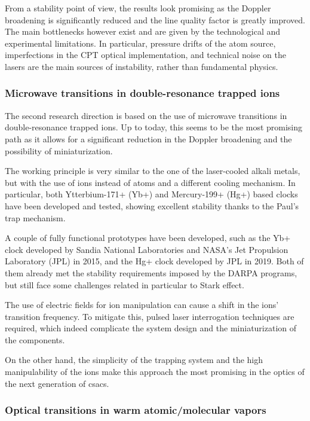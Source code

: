 From a stability point of view, the results look promising as the Doppler broadening is significantly reduced and the line quality factor is greatly improved.
The main bottlenecks however exist and are given by the technological and experimental limitations.
In particular, pressure drifts of the atom source, imperfections in the CPT optical implementation, and technical noise on the lasers are the main sources of instability, rather than fundamental physics.


\subsubsection{Microwave transitions in double-resonance trapped ions}
\label{subsubsec:double_resonance_ions}

The second research direction is based on the use of microwave transitions in double-resonance trapped ions.
Up to today, this seems to be the most promising path as it allows for a significant reduction in the Doppler broadening and the possibility of miniaturization.

The working principle is very similar to the one of the laser-cooled alkali metals, but with the use of ions instead of atoms and a different cooling mechanism.
In particular, both Ytterbium-171+ (Yb+) and Mercury-199+ (Hg+) based clocks have been developed and tested, showing excellent stability thanks to the Paul's trap mechanism.

A couple of fully functional prototypes have been developed, such as the Yb+ clock developed by Sandia National Laboratories and NASA's Jet Propulsion Laboratory (JPL) in 2015, and the Hg+ clock developed by JPL in 2019.
Both of them already met the stability requirements imposed by the DARPA programs, but still face some challenges related in particular to Stark effect.

The use of electric fields for ion manipulation can cause a shift in the ions' transition frequency.
To mitigate this, pulsed laser interrogation techniques are required, which indeed complicate the system design and the miniaturization of the components.

On the other hand, the simplicity of the trapping system and the high manipulability of the ions make this approach the most promising in the optics of the next generation of \acrshort{csacs}.


\subsubsection{Optical transitions in warm atomic/molecular vapors}
\label{subsubsec:optical_transitions}

